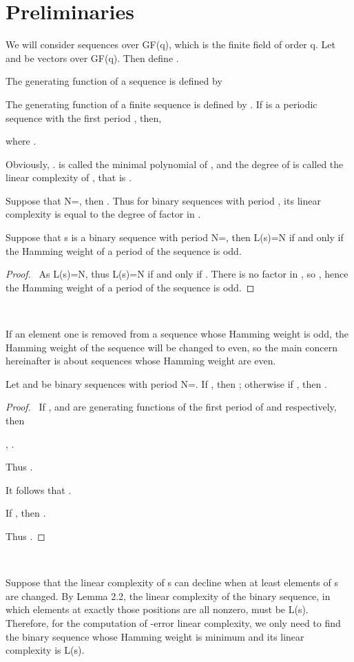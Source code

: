 \documentclass[10pt,conference,twocolumn]{IEEEtran}
\begin{document}
\section{Preliminaries}

We will consider sequences over GF(q), which is the finite field of
order q. Let  and 
be vectors over GF(q). Then define
.

The generating function of a sequence   is defined by 

The generating function of a finite sequence  is defined by . If  is a periodic sequence with the first
period , then,

where .

Obviously, . 
is called  the minimal polynomial of , and the degree of 
is called the linear complexity of , that is .


Suppose that N=, then .
Thus for binary sequences with period , its linear complexity
is equal to the degree of factor  in .



 Suppose that s is a binary sequence with
period N=, then L(s)=N if and only if the Hamming weight of a
period of the sequence is odd.


\begin{proof}\
 As  L(s)=N, thus L(s)=N if and only if .
  There is no factor  in , so , hence the Hamming weight of a period of the sequence is odd.
\end{proof}\

If an element one is removed from a sequence whose Hamming weight is
odd, the Hamming weight of the sequence will be changed to even, so
the main concern hereinafter is about sequences whose Hamming weight
are even.


  Let  and  be binary sequences
with period N=. If , then
; otherwise if ,
then .

\begin{proof}\
 If  ,  and  are  generating functions of the first period of  and 
  respectively, then

 , .

Thus .

It follows that .

If , then
.

Thus .
\end{proof}\

Suppose that the linear complexity of s can decline when at least
 elements of s are changed. By Lemma 2.2, the linear complexity
of the binary sequence, in which elements at exactly those 
positions are all nonzero, must be L(s). Therefore, for the
computation of -error linear complexity, we only need to find the
binary sequence whose Hamming weight is minimum and its linear
complexity is L(s).
\end{document}
